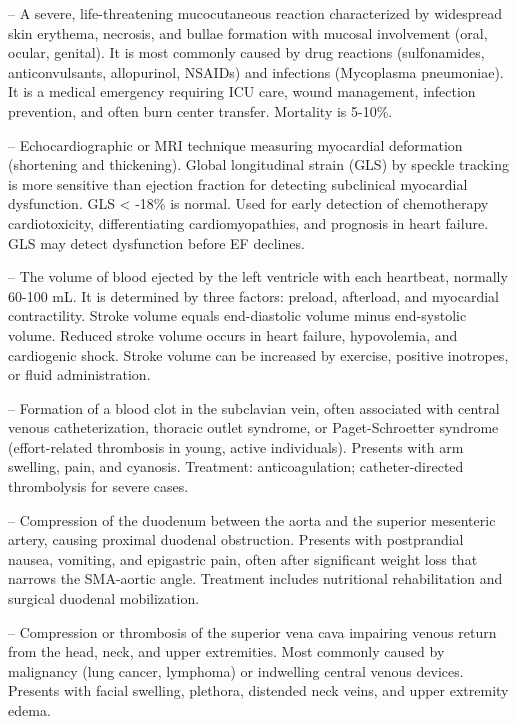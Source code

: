 -- A severe, life-threatening mucocutaneous reaction characterized by widespread skin erythema, necrosis, and bullae formation with mucosal involvement (oral, ocular, genital). It is most commonly caused by drug reactions (sulfonamides, anticonvulsants, allopurinol, NSAIDs) and infections (Mycoplasma pneumoniae). It is a medical emergency requiring ICU care, wound management, infection prevention, and often burn center transfer. Mortality is 5-10\%.

-- Echocardiographic or MRI technique measuring myocardial deformation (shortening and thickening). Global longitudinal strain (GLS) by speckle tracking is more sensitive than ejection fraction for detecting subclinical myocardial dysfunction. GLS < -18\% is normal. Used for early detection of chemotherapy cardiotoxicity, differentiating cardiomyopathies, and prognosis in heart failure. GLS may detect dysfunction before EF declines.

-- The volume of blood ejected by the left ventricle with each heartbeat, normally 60-100 mL. It is determined by three factors: preload, afterload, and myocardial contractility. Stroke volume equals end-diastolic volume minus end-systolic volume. Reduced stroke volume occurs in heart failure, hypovolemia, and cardiogenic shock. Stroke volume can be increased by exercise, positive inotropes, or fluid administration.

-- Formation of a blood clot in the subclavian vein, often associated with central venous catheterization, thoracic outlet syndrome, or Paget-Schroetter syndrome (effort-related thrombosis in young, active individuals). Presents with arm swelling, pain, and cyanosis. Treatment: anticoagulation; catheter-directed thrombolysis for severe cases.

-- Compression of the duodenum between the aorta and the superior mesenteric artery, causing proximal duodenal obstruction. Presents with postprandial nausea, vomiting, and epigastric pain, often after significant weight loss that narrows the SMA-aortic angle. Treatment includes nutritional rehabilitation and surgical duodenal mobilization.

-- Compression or thrombosis of the superior vena cava impairing venous return from the head, neck, and upper extremities. Most commonly caused by malignancy (lung cancer, lymphoma) or indwelling central venous devices. Presents with facial swelling, plethora, distended neck veins, and upper extremity edema.

